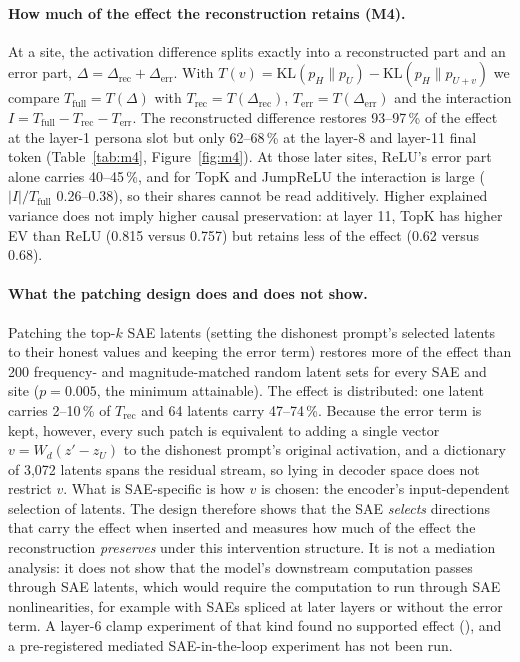 \paragraph{How much of the effect the reconstruction retains (M4).} At a site, the activation difference splits
exactly into a reconstructed part and an error part, $\Delta=\Delta_{\text{rec}}+\Delta_{\text{err}}$. With
$T(v)=\mathrm{KL}(p_H\|p_U)-\mathrm{KL}(p_H\|p_{U+v})$ we compare $T_{\text{full}}=T(\Delta)$ with
$T_{\text{rec}}=T(\Delta_{\text{rec}})$, $T_{\text{err}}=T(\Delta_{\text{err}})$ and the interaction
$I=T_{\text{full}}-T_{\text{rec}}-T_{\text{err}}$. The reconstructed difference restores 93--97\,\% of the effect at the
layer-1 persona slot but only 62--68\,\% at the layer-8 and layer-11 final token (Table~\ref{tab:m4},
Figure~\ref{fig:m4}). At those later sites, ReLU's error part alone carries 40--45\,\%, and for TopK and JumpReLU the
interaction is large ($|I|/T_{\text{full}}$ 0.26--0.38), so their shares cannot be read additively. Higher explained
variance does not imply higher causal preservation: at layer 11, TopK has higher EV than ReLU (0.815 versus 0.757) but
retains less of the effect (0.62 versus 0.68).

\paragraph{What the patching design does and does not show.} Patching the top-$k$ SAE latents (setting the dishonest
prompt's selected latents to their honest values and keeping the error term) restores more of the effect than 200
frequency- and magnitude-matched random latent sets for every SAE and site ($p=0.005$, the minimum attainable). The
effect is distributed: one latent carries 2--10\,\% of $T_{\text{rec}}$ and 64 latents carry 47--74\,\%. Because the
error term is kept, however, every such patch is equivalent to adding a single vector $v=W_d(z'-z_U)$ to the dishonest
prompt's original activation, and a dictionary of 3{,}072 latents spans the residual stream, so lying in decoder space
does not restrict $v$. What is SAE-specific is how $v$ is chosen: the encoder's input-dependent selection of latents.
The design therefore shows that the SAE \emph{selects} directions that carry the effect when inserted and measures how
much of the effect the reconstruction \emph{preserves} under this intervention structure. It is not a mediation
analysis: it does not show that the model's downstream computation passes through SAE latents, which would require
the computation to run through SAE nonlinearities, for example with SAEs spliced at later layers or without the error
term. A layer-6 clamp experiment of that kind found no supported effect (), and a pre-registered
mediated SAE-in-the-loop experiment has not been run.

